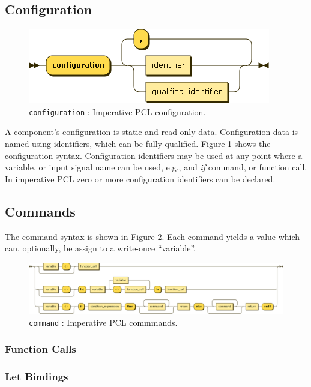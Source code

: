 \subsection{Configuration}
\begin{figure}[h!]
  \centering
    \includegraphics[scale=\DiagramScale]{chapters/adapter/diagrams/configuration}
  \caption{\texttt{configuration} : Imperative PCL configuration.}
  \label{fig:imperative-pcl-config}
\end{figure}
A component's configuration is static and read-only data. Configuration data is named using identifiers, which can be fully qualified. Figure \ref{fig:imperative-pcl-config} shows the configuration syntax. Configuration identifiers may be used at any point where a variable, or input signal name can be used, e.g., and \emph{if} command, or function call. In imperative PCL zero or more configuration identifiers can be declared.

\subsection{Commands}
The command syntax is shown in Figure \ref{fig:imperative-pcl-command}. Each command yields a value which can, optionally, be assign to a write-once ``variable''. 
\begin{figure}[h!]
  \centering
    \includegraphics[scale=0.45,angle=90]{chapters/adapter/diagrams/command}
  \caption{\texttt{command} : Imperative PCL commmands.}
  \label{fig:imperative-pcl-command}
\end{figure}

\subsubsection{Function Calls}


\subsubsection{Let Bindings}

